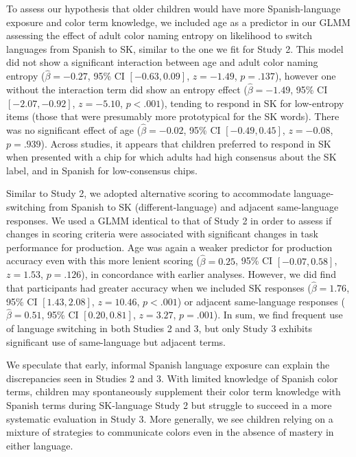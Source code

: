 \documentclass[
  english,
  ,apa7,floatsintext]{apa6}
\begin{document}
To assess our hypothesis that older children would have more Spanish-language exposure and color term knowledge, we included age as a predictor in our GLMM assessing the effect of adult color naming entropy on likelihood to switch languages from Spanish to SK, similar to the one we fit for Study 2. This model did not show a significant interaction between age and adult color naming entropy (\(\hat{\beta} = -0.27\), 95\% CI \([-0.63, 0.09]\), \(z = -1.49\), \(p = .137\)), however one without the interaction term did show an entropy effect (\(\hat{\beta} = -1.49\), 95\% CI \([-2.07, -0.92]\), \(z = -5.10\), \(p < .001\)), tending to respond in SK for low-entropy items (those that were presumably more prototypical for the SK words). There was no significant effect of age (\(\hat{\beta} = -0.02\), 95\% CI \([-0.49, 0.45]\), \(z = -0.08\), \(p = .939\)). Across studies, it appears that children preferred to respond in SK when presented with a chip for which adults had high consensus about the SK label, and in Spanish for low-consensus chips.

Similar to Study 2, we adopted alternative scoring to accommodate language-switching from Spanish to SK (different-language) and adjacent same-language responses. We used a GLMM identical to that of Study 2 in order to assess if changes in scoring criteria were associated with significant changes in task performance for production. Age was again a weaker predictor for production accuracy even with this more lenient scoring (\(\hat{\beta} = 0.25\), 95\% CI \([-0.07, 0.58]\), \(z = 1.53\), \(p = .126\)), in concordance with earlier analyses. However, we did find that participants had greater accuracy when we included SK responses (\(\hat{\beta} = 1.76\), 95\% CI \([1.43, 2.08]\), \(z = 10.46\), \(p < .001\)) or adjacent same-language responses (\(\hat{\beta} = 0.51\), 95\% CI \([0.20, 0.81]\), \(z = 3.27\), \(p = .001\)). In sum, we find frequent use of language switching in both Studies 2 and 3, but only Study 3 exhibits significant use of same-language but adjacent terms.

We speculate that early, informal Spanish language exposure can explain the discrepancies seen in Studies 2 and 3. With limited knowledge of Spanish color terms, children may spontaneously supplement their color term knowledge with Spanish terms during SK-language Study 2 but struggle to succeed in a more systematic evaluation in Study 3. More generally, we see children relying on a mixture of strategies to communicate colors even in the absence of mastery in either language.
\end{document}
